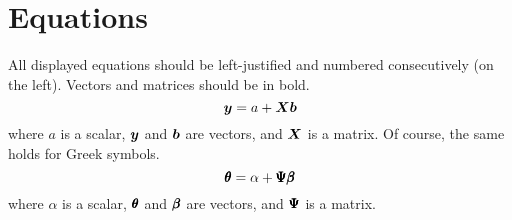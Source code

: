 \documentclass{ajae}
\begin{document}
\section{Equations}
All displayed equations should be left-justified
and numbered consecutively (on the left).
Vectors and matrices should be in bold.
\begin{equation}
\bm{ y } = a + \bm{ X } \bm{ b }
\end{equation}
where $a$ is a scalar,
$\bm{ y }$ and $\bm{ b }$ are vectors,
and $\bm{ X }$ is a matrix.
Of course, the same holds for Greek symbols.
\begin{equation}
\pmb{ \theta } = \alpha + \pmb{ \Psi } \pmb{ \beta }
\end{equation}
where $\alpha$ is a scalar,
$\pmb{ \theta }$ and $\pmb{ \beta }$ are vectors,
and $\pmb{ \Psi }$ is a matrix.

\clearpage
\listofendnotes

\clearpage
\nocite{*}



\end{document}
